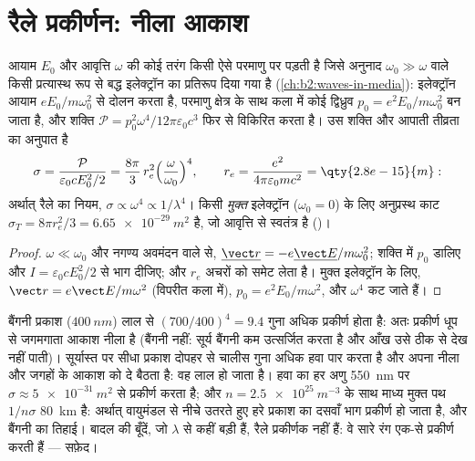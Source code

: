 \section{रैले प्रकीर्णन: नीला आकाश}

\begin{proposition}[किसी बद्ध इलेक्ट्रॉन से प्रकीर्णन]\label{prop:b2:dipole-radiation:rayleigh}
आयाम $E_0$ और आवृत्ति $\omega$ की कोई तरंग किसी ऐसे परमाणु पर पड़ती है जिसे
अनुनाद $\omega_0 \gg \omega$ वाले किसी प्रत्यास्थ रूप से बद्ध इलेक्ट्रॉन का प्रतिरूप दिया गया है
(\cref{ch:b2:waves-in-media}): इलेक्ट्रॉन आयाम
$eE_0/m\omega_0^2$ से दोलन करता है, परमाणु क्षेत्र के साथ कला में कोई द्विध्रुव $p_0 = e^2E_0/m\omega_0^2$
बन जाता है, और शक्ति $\mathcal P = p_0^2\omega^4/12\pi
\varepsilon_0c^3$ फिर से विकिरित करता है। उस शक्ति और आपाती तीव्रता का अनुपात है
\emph{}
\[
\sigma = \frac{\mathcal P}{\varepsilon_0cE_0^2/2} = \frac{8\pi}3\,r_e^2\Bigl(\frac\omega{\omega_0}\Bigr)^4 ,
\qquad r_e = \frac{e^2}{4\pi\varepsilon_0mc^2} = \qty{2.8e-15}{m} :
\]
अर्थात् रैले का नियम, $\sigma \propto \omega^4 \propto 1/\lambda^4$। किसी \emph{मुक्त}
इलेक्ट्रॉन ($\omega_0 = 0$) के लिए अनुप्रस्थ काट $\sigma_T = 8\pi r_e^2/3 =
\qty{6.65e-29}{m^2}$ है, जो आवृत्ति से स्वतंत्र है ()।
\end{proposition}

\begin{proof}
$\omega \ll \omega_0$ और नगण्य अवमंदन वाले  से,
$\underline{\vect r} = -e\underline{\vect E}/m\omega_0^2$; शक्ति में $p_0$ डालिए और
$I = \varepsilon_0cE_0^2/2$ से भाग दीजिए; और $r_e$ अचरों को समेट लेता है। मुक्त
इलेक्ट्रॉन के लिए, $\vect r = e\vect E/m\omega^2$ (विपरीत कला में), $p_0 = e^2E_0/m\omega^2$, और
$\omega^4$ कट जाते हैं।
\end{proof}

\begin{example}[नीला आकाश, लाल सूर्यास्त, सफ़ेद बादल]\label{ex:b2:dipole-radiation:sky}
बैंगनी प्रकाश ($\qty{400}{nm}$) लाल से $(700/400)^4 = 9.4$ गुना अधिक
प्रकीर्ण होता है: अतः प्रकीर्ण धूप से जगमगाता आकाश नीला है (बैंगनी नहीं:
सूर्य बैंगनी कम उत्सर्जित करता है और आँख उसे ठीक से देख नहीं पाती)। सूर्यास्त पर सीधा
प्रकाश दोपहर से चालीस गुना अधिक हवा पार करता है और अपना नीला
और जगहों के आकाश को दे बैठता है: वह लाल हो जाता है। हवा का हर अणु
\qty{550}{nm} पर $\sigma \approx \qty{5e-31}{m^2}$ से प्रकीर्ण करता है; और $n = \qty{2.5e25}{m^{-3}}$ के साथ
माध्य मुक्त पथ $1/n\sigma$ \qty{80}{km} है: अर्थात् वायुमंडल से नीचे उतरते हुए हरे
प्रकाश का दसवाँ भाग प्रकीर्ण हो जाता है, और बैंगनी का
तिहाई। बादल की बूँदें, जो $\lambda$ से कहीं बड़ी हैं, रैले
प्रकीर्णक नहीं हैं: वे सारे रंग एक-से प्रकीर्ण करती हैं --- सफ़ेद।
\end{example}

